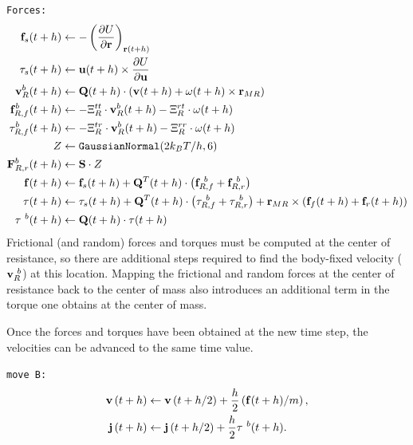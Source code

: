 \documentclass[]{book}
\begin{document}
{\tt Forces:}
\begin{align*}
{\bf f}_{s}(t + h) & \leftarrow
    - \left(\frac{\partial U}{\partial {\bf r}}\right)_{{\bf r}(t + h)} \\
%
{\bf \tau}_{s}(t + h) &\leftarrow {\bf u}(t + h)
    \times \frac{\partial U}{\partial {\bf u}} \\
%
{\bf v}^{b}_{R}(t+h) & \leftarrow \mathbf{Q}(t+h) \cdot \left({\bf v}(t+h) + {\bf \omega}(t+h) \times {\bf r}_{MR} \right) \\
%
{\bf f}_{R,f}^{b}(t+h) & \leftarrow - \Xi_{R}^{tt} \cdot
{\bf v}^{b}_{R}(t+h) - \Xi_{R}^{rt} \cdot {\bf \omega}(t+h) \\
%
{\bf \tau}_{R,f}^{b}(t+h) & \leftarrow - \Xi_{R}^{tr} \cdot
{\bf v}^{b}_{R}(t+h) - \Xi_{R}^{rr} \cdot {\bf \omega}(t+h) \\
%
Z & \leftarrow  {\tt GaussianNormal}(2 k_B T / h, 6) \\
{\bf F}_{R,r}^{b}(t+h) & \leftarrow {\bf S} \cdot Z \\
%
{\bf f}(t+h) & \leftarrow {\bf f}_{s}(t+h) + \mathbf{Q}^{T}(t+h)
\cdot \left({\bf f}_{R,f}^{~b} + {\bf f}_{R,r}^{~b} \right) \\
%
\tau(t+h) & \leftarrow \tau_{s}(t+h) + \mathbf{Q}^{T}(t+h) \cdot \left(\tau_{R,f}^{~b} + \tau_{R,r}^{~b} \right) + {\bf r}_{MR} \times \left({\bf f}_{f}(t+h) + {\bf f}_{r}(t+h) \right) \\
\tau^{~b}(t+h) & \leftarrow \mathbf{Q}(t+h) \cdot \tau(t+h) \\
\end{align*}
Frictional (and random) forces and torques must be computed at the
center of resistance, so there are additional steps required to find
the body-fixed velocity (${\bf v}_{R}^{~b}$) at this location.  Mapping
the frictional and random forces at the center of resistance back to
the center of mass also introduces an additional term in the torque
one obtains at the center of mass.

Once the forces and torques have been obtained at the new time step,
the velocities can be advanced to the same time value.

{\tt move B:}
\begin{align*}
{\bf v}\left(t + h \right)  &\leftarrow  {\bf v}\left(t + h / 2
\right)
    + \frac{h}{2} \left( {\bf f}(t + h) / m \right), \\
%
{\bf j}\left(t + h \right)  &\leftarrow {\bf j}\left(t + h / 2
\right)
    + \frac{h}{2} {\bf \tau}^{~b}(t + h) .
\end{align*}
\end{document}
